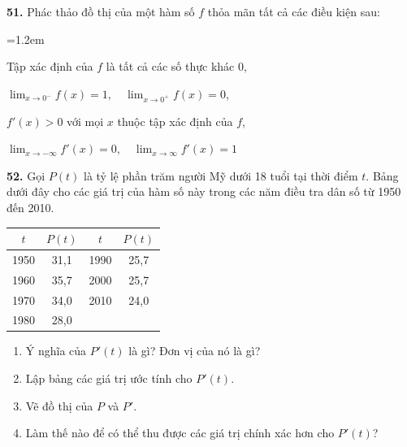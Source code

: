 \noindent
\begin{minipage}[t]{0.482\textwidth}

\textbf{51.} Phác thảo đồ thị của một hàm số $f$ thỏa mãn tất cả các điều kiện sau:
\begin{list}{}{\leftmargin=1.2em \itemsep=2.5pt \topsep=3pt \parsep=0pt}
    \item Tập xác định của $f$ là tất cả các số thực khác 0,
    \item $\displaystyle \lim_{x \to 0^-} f(x) = 1, \quad \lim_{x \to 0^+} f(x) = 0$,
    \item $f'(x) > 0$ với mọi $x$ thuộc tập xác định của $f$,
    \item $\displaystyle \lim_{x \to -\infty} f'(x) = 0, \quad \lim_{x \to \infty} f'(x) = 1$
\end{list}

\vspace{10pt}

\textbf{52.} Gọi $P(t)$ là tỷ lệ phần trăm người Mỹ dưới 18 tuổi tại thời điểm $t$. Bảng dưới đây cho các giá trị của hàm số này trong các năm điều tra dân số từ 1950 đến 2010.

\begin{center}
\small
\renewcommand{\arraystretch}{1.15}
\setlength{\tabcolsep}{8pt}
\begin{tabular}{|c|c||c|c|}
\hline
\rowcolor{tableheader}
$t$ & $P(t)$ & $t$ & $P(t)$ \\
\hline
1950 & 31{,}1 & 1990 & 25{,}7 \\
1960 & 35{,}7 & 2000 & 25{,}7 \\
1970 & 34{,}0 & 2010 & 24{,}0 \\
1980 & 28{,}0 &      &        \\
\hline
\end{tabular}
\end{center}

\begin{enumerate}[label=\textbf{(\alph*)}, leftmargin=*, itemsep=2pt, topsep=1pt]
    \item Ý nghĩa của $P'(t)$ là gì? Đơn vị của nó là gì?
    \item Lập bảng các giá trị ước tính cho $P'(t)$.
    \item Vẽ đồ thị của $P$ và $P'$.
    \item Làm thế nào để có thể thu được các giá trị chính xác hơn cho $P'(t)$?
\end{enumerate}


\end{minipage}
